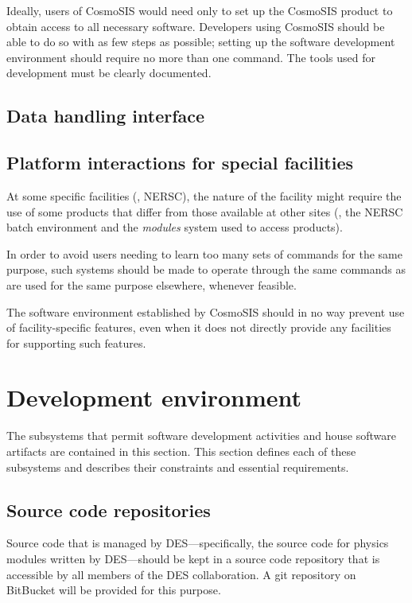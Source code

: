 \documentclass{memarticle}
\begin{document}
Ideally, users of CosmoSIS would need only to set up the CosmoSIS
product to obtain access to all necessary software. Developers using
CosmoSIS should be able to do so with as few steps as possible; setting
up the software development environment should require no more than one
command. The tools used for development must be clearly documented.

\subsection{Data handling interface}


\subsection{Platform interactions for special facilities}

At some specific facilities (\eg, NERSC), the nature of the facility
might require the use of some products that differ from those available
at other sites (\eg, the NERSC batch environment and the \emph{modules}
system used to access products).

In order to avoid users needing to learn too many sets of commands for
the same purpose, such systems should be made to operate through the
same commands as are used for the same purpose elsewhere, whenever
feasible.

The software environment established by CosmoSIS should in no way
prevent use of facility-specific features, even when it does not
directly provide any facilities for supporting such features.

\section{Development environment}

The subsystems that permit software development activities and house
software artifacts are contained in this section. This section defines
each of these subsystems and describes their constraints and essential
requirements.

\subsection{Source code repositories}

Source code that is managed by DES---specifically, the source code for
physics modules written by DES---should be kept in a source code
repository that is accessible by all members of the DES collaboration. A
git repository on BitBucket will be provided for this purpose.
\end{document}
